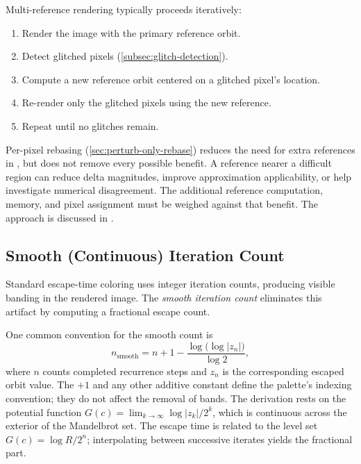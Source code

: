 Multi-reference rendering typically proceeds iteratively:
\begin{enumerate}
  \item Render the image with the primary reference orbit.
  \item Detect glitched pixels (\cref{subsec:glitch-detection}).
  \item Compute a new reference orbit centered on a glitched pixel's
        location.
  \item Re-render only the glitched pixels using the new reference.
  \item Repeat until no glitches remain.
\end{enumerate}

Per-pixel rebasing (\cref{sec:perturb-only-rebase}) reduces the need for
extra references in \FractalShark{}, but does not remove every possible
benefit.  A reference nearer a difficult region can reduce delta magnitudes,
improve approximation applicability, or help investigate numerical disagreement.
The additional reference computation, memory, and pixel assignment must be
weighed against that benefit.  The approach is discussed in
\cite{HeilandAllen2022DeepZoom}.

\subsection{Smooth (Continuous) Iteration Count}
\label{subsec:smooth-coloring}

Standard escape-time coloring uses integer iteration counts, producing
visible banding in the rendered image.  The \emph{smooth iteration
count} eliminates this artifact by computing a fractional escape count.

One common convention for the smooth count is
\begin{equation}
  n_{\text{smooth}} = n + 1
    - \frac{\log\!\bigl(\log|z_n|\bigr)}{\log 2},
  \label{eq:smooth-iter}
\end{equation}
where $n$ counts completed recurrence steps and $z_n$ is the corresponding
escaped orbit value.  The $+1$ and any other additive constant define the
palette's indexing convention; they do not affect the removal of bands.
The derivation rests on the potential function
$G(c) = \lim_{k\to\infty} \log|z_k| / 2^k$, which is continuous across
the exterior of the Mandelbrot set.  The escape time is related to the
level set $G(c) = \log R / 2^n$; interpolating between successive
iterates yields the fractional part.


